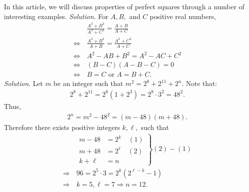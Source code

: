 \begin{multicols}{2}
	In this article, we will discuss properties of perfect squares through a number of interesting examples.
	\vskip 0.2cm
	\vskip 0.1cm
	\textit{Solution.}
	For $A, B,$ and $C$ positive real numbers,
	\begin{align*}
		&\frac{A^3+B^3}{A^3+C^3} = \frac{A+B}{A+C} \\
		\Leftrightarrow\, &\frac{A^3+B^3}{A+B} = \frac{A^3+C^3}{A+C}\\
		\Leftrightarrow\, &A^2 - AB + B^2 = A^2 - AC + C^2\\
		\Leftrightarrow\, &(B-C)(A-B-C) = 0 \\
		\Leftrightarrow\, &{B=C} \text{\ or\ } {A = B+C.}
	\end{align*}
	\vskip 0.1cm
	\textit{Solution.}
	Let $m$ be an integer such that \linebreak $m^2 = 2^8 + 2^{11} + 2^n.$ Note that:
	\begin{align*}
		2^8 + 2^{11} = 2^8(1+2^3) = 2^8 \cdot 3^2 = 48^2.
	\end{align*}
	Thus,
	\begin{align*}
		2^n = m^2 - 48^2 = (m-48)(m+48).
	\end{align*}
	Therefore there exists positive integers $k, \ell,$ such that
	\begin{align*}
		&\left.
		\begin{aligned}
			m-48 &= 2^k \quad (1)\\
			m+48 &= 2^{\ell} \quad (2)\\
			k + \ell &= n
		\end{aligned}
		\right\}
		(2) - (1) \\
		\Rightarrow \,&96 = 2^5 \cdot 3 = 2^k(2^{\ell-k}-1)\\
		\Rightarrow \,&k = 5, \ell = 7 \Rightarrow {n = 12.}

\end{align*}
\end{multicols}
